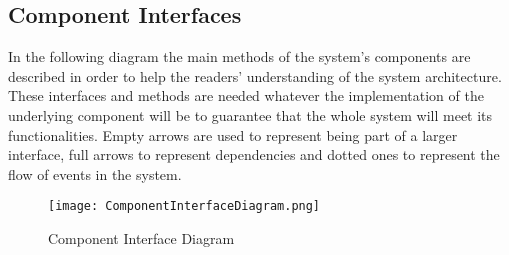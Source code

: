 \subsection{Component Interfaces}
In the following diagram the main methods of the system's components are described in order to help the readers' understanding of the system architecture. These interfaces and methods are needed whatever the implementation of the underlying component will be to guarantee that the whole system will meet its functionalities.
Empty arrows are used to represent being part of a larger interface, full arrows to represent dependencies and dotted ones to represent the flow of events in the system.

\FloatBarrier
\begin{figure}[!h]
	\centering
	\texttt{[image: ComponentInterfaceDiagram.png]}
	\caption{Component Interface Diagram}
\end{figure}
\FloatBarrier

